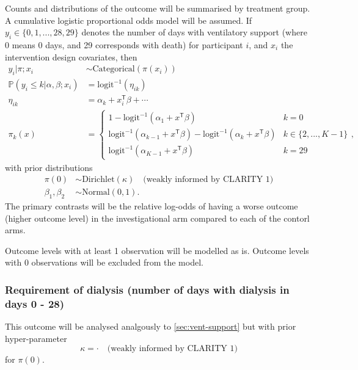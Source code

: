 \documentclass[11pt,parskip=half-]{scrartcl}
\begin{document}
Counts and distributions of the outcome will be summarised by treatment group. A cumulative logistic proportional odds model will be assumed. If $y_i\in\{0,1,...,28,29\}$ denotes the number of days with ventilatory support (where 0 means 0 days, and 29 corresponds with death) for participant $i$, and $x_i$ the intervention design covariates, then
$$
    \begin{aligned}
        y_{i} | \pi;x_i                            & \sim \text{Categorical}(\pi(x_i))           \\
        \mathbb P(y_i \leq k | \alpha, \beta; x_i) & = \text{logit}^{-1}(\eta_{ik})              \\
        \eta_{ik}                                  & = \alpha_k + x_i^{\mathsf{T}}\beta + \cdots \\
        \pi_k(x)                                   & = \begin{cases}
            1 - \text{logit}^{-1}(\alpha_1 + x^\mathsf{T}\beta)                                                     & k=0               \\
            \text{logit}^{-1}(\alpha_{k-1} + x^\mathsf{T}\beta) - \text{logit}^{-1}(\alpha_{k} + x^\mathsf{T}\beta) & k\in\{2,...,K-1\} \\
            \text{logit}^{-1}(\alpha_{K-1} + x^\mathsf{T}\beta)                                                     & k=29
        \end{cases},
    \end{aligned}
$$
with prior distributions
$$
    \begin{aligned}
        \pi(0)          & \sim \text{Dirichlet}(\kappa) \quad \text{(weakly informed by CLARITY 1)} \\
        \beta_1,\beta_2 & \sim \text{Normal}(0, 1).
    \end{aligned}
$$
The primary contrasts will be the relative log-odds of having a worse outcome (higher outcome level) in the investigational arm compared to each of the contorl arms.

Outcome levels with at least 1 observation will be modelled as is. Outcome levels with 0 observations will be excluded from the model.

\subsubsection{Requirement of dialysis (number of days with dialysis in days 0 - 28)}

This outcome will be analysed analgously to \ref{sec:vent-support} but with prior hyper-parameter
$$
    \kappa = \cdot \quad \text{(weakly informed by CLARITY 1)}
$$
for $\pi(0)$.
\end{document}
